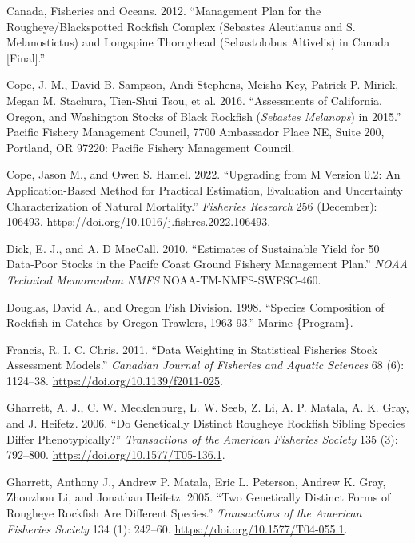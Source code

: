 \documentclass[
]{scrartcl}
\newlength{\cslhangindent}
\newenvironment{CSLReferences}[2] %
 {\begin{list}{}{%
  \setlength{\itemindent}{0pt}
  \setlength{\leftmargin}{0pt}
  \setlength{\parsep}{0pt}
  \ifodd #1
   \setlength{\leftmargin}{\cslhangindent}
   \setlength{\itemindent}{-1\cslhangindent}
  \fi
  \setlength{\itemsep}{#2\baselineskip}}}
 {\end{list}}
\begin{document}
\label{refs}
\begin{CSLReferences}{1}{0}
Canada, Fisheries and Oceans. 2012. {``Management {Plan} for the
{Rougheye}/{Blackspotted} {Rockfish} {Complex} ({Sebastes} Aleutianus
and {S}. Melanostictus) and {Longspine} {Thornyhead} ({Sebastolobus}
Altivelis) in {Canada} {[}{Final}{]}.''}

Cope, J. M., David B. Sampson, Andi Stephens, Meisha Key, Patrick P.
Mirick, Megan M. Stachura, Tien-Shui Tsou, et al. 2016. {``Assessments
of {California}, {Oregon}, and {Washington} Stocks of Black Rockfish
(\emph{{Sebastes} Melanops}) in 2015.''} Pacific Fishery Management
Council, 7700 Ambassador Place NE, Suite 200, Portland, OR 97220:
Pacific Fishery Management Council.

Cope, Jason M., and Owen S. Hamel. 2022. {``Upgrading from {M} Version
0.2: {An} Application-Based Method for Practical Estimation, Evaluation
and Uncertainty Characterization of Natural Mortality.''}
\emph{Fisheries Research} 256 (December): 106493.
\url{https://doi.org/10.1016/j.fishres.2022.106493}.

Dick, E. J., and A. D MacCall. 2010. {``Estimates of Sustainable Yield
for 50 Data-Poor Stocks in the {Pacifc} Coast Ground {Fishery}
{Management} {Plan}.''} \emph{NOAA Technical Memorandum NMFS}
NOAA-TM-NMFS-SWFSC-460.

Douglas, David A., and Oregon Fish Division. 1998. {``Species
Composition of Rockfish in Catches by {Oregon} Trawlers, 1963-93.''}
Marine \{Program\}.

Francis, R. I. C. Chris. 2011. {``Data Weighting in Statistical
Fisheries Stock Assessment Models.''} \emph{Canadian Journal of
Fisheries and Aquatic Sciences} 68 (6): 1124--38.
\url{https://doi.org/10.1139/f2011-025}.

Gharrett, A. J., C. W. Mecklenburg, L. W. Seeb, Z. Li, A. P. Matala, A.
K. Gray, and J. Heifetz. 2006. {``Do {Genetically} {Distinct} {Rougheye}
{Rockfish} {Sibling} {Species} {Differ} {Phenotypically}?''}
\emph{Transactions of the American Fisheries Society} 135 (3): 792--800.
\url{https://doi.org/10.1577/T05-136.1}.

Gharrett, Anthony J., Andrew P. Matala, Eric L. Peterson, Andrew K.
Gray, Zhouzhou Li, and Jonathan Heifetz. 2005. {``Two {Genetically}
{Distinct} {Forms} of {Rougheye} {Rockfish} {Are} {Different}
{Species}.''} \emph{Transactions of the American Fisheries Society} 134
(1): 242--60. \url{https://doi.org/10.1577/T04-055.1}.


\end{CSLReferences}
\end{document}
